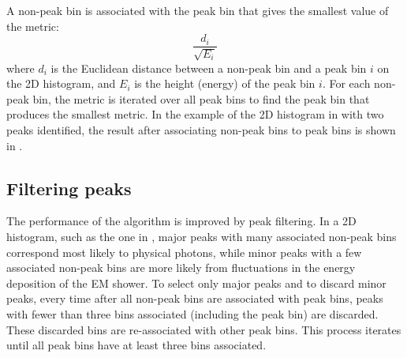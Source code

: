 A non-peak bin is associated with the peak bin that gives the smallest value of the metric:
\begin{equation}
\frac{d_{i}}{\sqrt{E_{i}}}
\end{equation}
where $d_{i}$ is the Euclidean distance between a non-peak bin and a  peak bin $i$ on the 2D histogram, and $E_{i}$ is the height (energy) of the peak bin $i$. For each non-peak bin, the metric is iterated over all peak bins to find the peak bin that produces the smallest metric. In the example of the 2D histogram in  with two peaks identified, the result after associating non-peak bins to peak bins is shown in .



\subsection{Filtering peaks}

The performance of the \peakFinding algorithm is improved by peak filtering. In a 2D histogram, such as the one in , major peaks with many associated non-peak bins correspond most likely  to physical photons, while minor peaks with a few associated non-peak bins are more likely from fluctuations in the energy deposition of the EM shower. To select only major peaks and to discard minor peaks, every time after all non-peak bins are associated with peak bins, peaks with fewer than three bins associated (including the peak bin) are discarded. These discarded bins are re-associated with other peak bins. This  process iterates until all peak bins have at least three bins associated.


